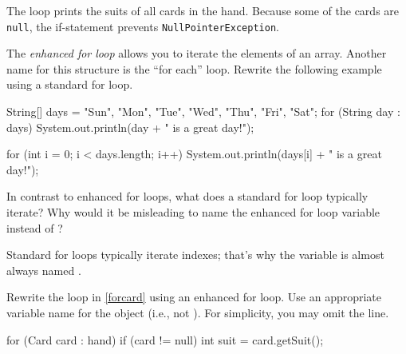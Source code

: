 \begin{answer}
The loop prints the suits of all cards in the hand.
Because some of the cards are {\tt null}, the if-statement prevents {\tt NullPointerException}.
\end{answer}


\Q The \emph{enhanced for loop} allows you to iterate the elements of an array.
Another name for this structure is the ``for each'' loop.
Rewrite the following example using a standard for loop.

\vspace{1ex}
\begin{javalst}
String[] days = {"Sun", "Mon", "Tue", "Wed", "Thu", "Fri", "Sat"};
for (String day : days) {
    System.out.println(day + " is a great day!");
}
\end{javalst}
\vspace{-1em}

\begin{answer}[5em]
\begin{javaans}
for (int i = 0; i < days.length; i++) {
    System.out.println(days[i] + " is a great day!");
}
\end{javaans}
\end{answer}


\Q In contrast to enhanced for loops, what does a standard for loop typically iterate?
Why would it be misleading to name the enhanced for loop variable  instead of ?

\begin{answer}[3em]
Standard for loops typically iterate indexes; that's why the variable is almost always named .
\end{answer}


\Q \label{foreach}
Rewrite the loop in \ref{forcard} using an enhanced for loop.
Use an appropriate variable name for the  object (i.e., not ).
For simplicity, you may omit the  line.

\vspace{-1ex}
\begin{answer}[7em]
\begin{javaans}
for (Card card : hand) {
    if (card != null) {
        int suit = card.getSuit();
    }
}
\end{javaans}
\end{answer}
